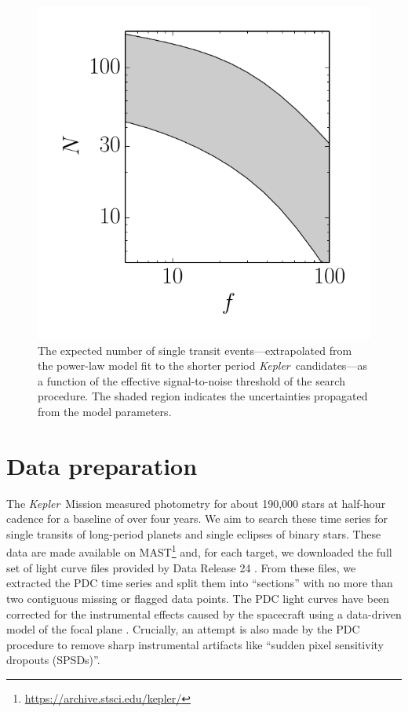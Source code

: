 \documentclass[12pt,preprint]{aastex}
\newcommand{\project}[1]{\textsl{#1}}
\newcommand{\kepler}{\project{Kepler}}
\newcommand{\figlabel}[1]{\label{fig:#1}}
\begin{document}
\begin{figure}[p]
\begin{center}
\includegraphics{figures/predict.pdf}
\end{center}
\caption{%
The expected number of single transit events---extrapolated from the
\citet{Dong:2013} power-law model fit to the shorter period \kepler\
candidates---as a function of the effective signal-to-noise threshold of the
search procedure.
The shaded region indicates the uncertainties propagated from the model
parameters.
\figlabel{predict}}
\end{figure}


\section{Data preparation}

The \kepler\ Mission measured photometry for about 190,000 stars at half-hour
cadence for a baseline of over four years.
We aim to search these time series for single transits of long-period planets
and single eclipses of binary stars.
These data are made available on
MAST\footnote{\url{https://archive.stsci.edu/kepler/}} and, for each target,
we downloaded the full set of light curve files provided by Data Release 24
\citep{Thompson:2015}.
From these files, we extracted the PDC time series and split them into
``sections'' with no more than two contiguous missing or flagged data points.
The PDC light curves have been corrected for the instrumental effects caused
by the spacecraft using a data-driven model of the focal plane
\citep{Stumpe:2012, Smith:2012}.
Crucially, an attempt is also made by the PDC procedure to remove sharp
instrumental artifacts like ``sudden pixel sensitivity dropouts (SPSDs)''.
\end{document}
